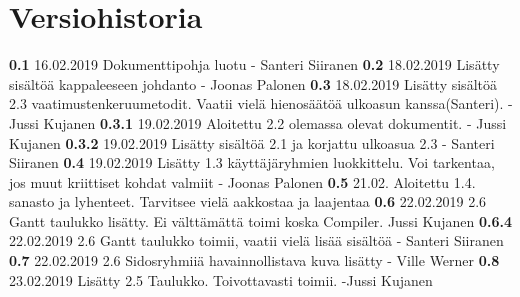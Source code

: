 \chapter*{Versiohistoria}

\newcommand{\currentversion}{0.7} %

\textbf{0.1} 16.02.2019 Dokumenttipohja luotu - Santeri Siiranen \newline
\textbf{0.2} 18.02.2019 Lisätty sisältöä kappaleeseen johdanto - Joonas Palonen \newline
\textbf{0.3} 18.02.2019 Lisätty sisältöä 2.3 vaatimustenkeruumetodit. Vaatii vielä hienosäätöä ulkoasun kanssa(Santeri). - Jussi Kujanen \newline
\textbf{0.3.1} 19.02.2019 Aloitettu 2.2 olemassa olevat dokumentit. - Jussi Kujanen \newline
\textbf{0.3.2} 19.02.2019 Lisätty sisältöä 2.1 ja korjattu ulkoasua 2.3 - Santeri Siiranen \newline
\textbf{0.4} 19.02.2019 Lisätty 1.3 käyttäjäryhmien luokkittelu. Voi tarkentaa, jos muut kriittiset kohdat valmiit - Joonas Palonen \newline
\textbf{0.5} 21.02. Aloitettu 1.4. sanasto ja lyhenteet. Tarvitsee vielä aakkostaa ja laajentaa \newline
\textbf{0.6} 22.02.2019 2.6 Gantt taulukko lisätty. Ei välttämättä toimi koska Compiler. Jussi Kujanen \newline
\textbf{0.6.4} 22.02.2019 2.6 Gantt taulukko toimii, vaatii vielä lisää sisältöä - Santeri Siiranen \newline
\textbf{0.7} 22.02.2019 2.6 Sidosryhmiiä havainnollistava kuva lisätty - Ville Werner \newline
\textbf{0.8} 23.02.2019 Lisätty 2.5 Taulukko. Toivottavasti toimii. -Jussi Kujanen \newline
